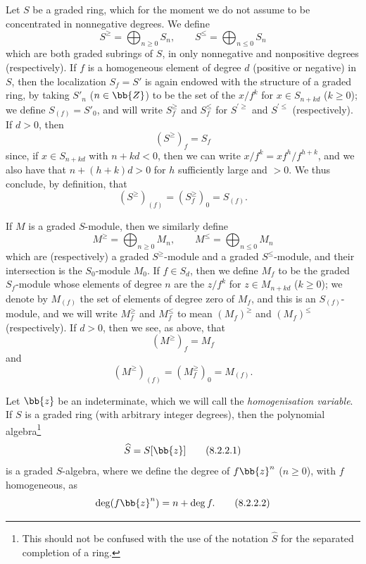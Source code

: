 \begin{env}[8.2.1]
\label{II.8.2.1}
Let $S$ be a graded ring, which for the moment we do not assume to be concentrated in nonnegative degrees.
We define
\[
\label{II.8.2.1.1}
  S^\geq = \bigoplus_{n\geq0} S_n,
  \qquad
  S^\leq = \bigoplus_{n\leq0} S_n
\tag{8.2.1.1}
\]
which are both graded subrings of $S$, in only nonnegative and nonpositive degrees (respectively).
If $f$ is a homogeneous element of degree $d$ (positive or negative) in $S$, then the localization $S_f=S'$ is again endowed with the structure of a graded ring, by taking $S'_n$ ($n\in\bb{Z}$) to be the set of the $x/f^k$ for $x\in S_{n+kd}$ ($k\geq0$);
we define $S_{(f)}=S'_0$, and will write $S_f^\geq$ and $S_f^\leq$ for $S^{'\geq}$ and $S^{'\leq}$ (respectively).
If $d>0$, then
\[
\label{II.8.2.1.2}
  (S^\geq)_f = S_f
\tag{8.2.1.2}
\]
since, if $x\in S_{n+kd}$ with $n+kd<0$, then we can write $x/f^k = xf^h/f^{h+k}$, and we also have that $n+(h+k)d>0$ for $h$ sufficiently large and $>0$.
We thus conclude, by definition, that
\[
\label{II.8.2.1.3}
  (S^\geq)_{(f)} = (S_f^\geq)_0 = S_{(f)}.
\tag{8.2.1.3}
\]

If $M$ is a graded $S$-module, then we similarly define
\[
\label{II.8.2.1.4}
  M^\geq = \bigoplus_{n\geq0} M_n,
  \qquad
  M^\leq = \bigoplus_{n\leq0} M_n
\tag{8.2.1.4}
\]
which are (respectively) a graded $S^\geq$-module and a graded $S^\leq$-module, and their intersection is the $S_0$-module $M_0$.
If $f\in S_d$, then we define $M_f$ to be the graded $S_f$-module whose elements of degree $n$ are the $z/f^k$ for $z\in M_{n+kd}$ ($k\geq0$);
we denote by $M_{(f)}$ the set of elements of degree zero of $M_f$, and this is an $S_{(f)}$-module, and we will write $M_f^\geq$ and $M_f^\leq$ to mean $(M_f)^\geq$ and $(M_f)^\leq$ (respectively).
If $d>0$, then we see, as above, that
\[
\label{II.8.2.1.5}
  (M^\geq)_f = M_f
\tag{8.2.1.5}
\]
and
\[
\label{II.8.2.1.6}
  (M^\geq)_{(f)} = (M_f^\geq)_0 = M_{(f)}.
\tag{8.2.1.6}
\]
\end{env}

\begin{env}[8.2.2]
\label{II.8.2.2}
Let $\bb{z}$ be an indeterminate, which we will call the \emph{homogenisation variable}.
If $S$ is a graded ring (with arbitrary integer degrees), then the polynomial algebra\footnote{This should not be confused with the use of the notation $\widehat{S}$ for the separated completion of a ring.}
\[
\label{II.8.2.2.1}
  \widehat{S} = S[\bb{z}]
\tag{8.2.2.1}
\]
is a graded $S$-algebra, where we define the degree of $f\bb{z}^n$ ($n\geq0$), with $f$ homogeneous, as
\[
\label{II.8.2.2.2}
  \deg(f\bb{z}^n) = n+\deg f.
\tag{8.2.2.2}
\]
\end{env}

